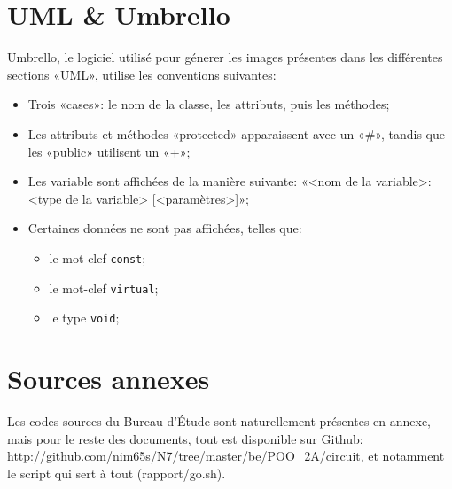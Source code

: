 \documentclass{report}
\begin{document}
\section{UML \& Umbrello}
Umbrello, le logiciel utilisé pour génerer les images présentes dans les différentes sections «UML», utilise
les conventions suivantes:
\begin{itemize}
    \item Trois «cases»: le nom de la classe, les attributs, puis les méthodes;
    \item Les attributs et méthodes «protected» apparaissent avec un «\#», tandis que les «public» utilisent un «+»;
    \item Les variable sont affichées de la manière suivante: «<nom de la variable>: <type de la variable> [<paramètres>]»;
    \item Certaines données ne sont pas affichées, telles que:
        \begin{itemize}
            \item le mot-clef \verb|const|;
            \item le mot-clef \verb|virtual|;
            \item le type \verb|void|;
        \end{itemize}
\end{itemize}

\section{Sources annexes}
Les codes sources du Bureau d’Étude sont naturellement présentes en annexe, mais pour le reste des documents,
tout est disponible sur Github: \url{http://github.com/nim65s/N7/tree/master/be/POO_2A/circuit}, et
notamment le script qui sert à tout (rapport/go.sh).
\end{document}
